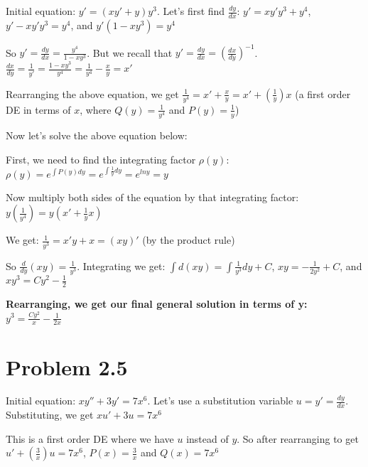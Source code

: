 \documentclass{article}
\begin{document}
\noindent Initial equation: $y' = (xy' + y)y^{3}$.  Let's first find $\frac{dy}{dx}$: $y' = xy'y^{3} + y^{4}$, $y' - xy'y^{3} = y^{4}$, and $y'(1 - xy^{3}) = y^{4}$\par
\noindent So $y' = \frac{dy}{dx} = \frac{y^{4}}{1 - xy^{3}}$.  But we recall that $y' = \frac{dy}{dx} = (\frac{dx}{dy})^{-1}$.  $\frac{dx}{dy} = \frac{1}{y'} = \frac{1 - xy^{3}}{y^{4}} = \frac{1}{y^{4}} - \frac{x}{y} = x'$ \par

\noindent Rearranging the above equation, we get $\frac{1}{y^{4}} = x' + \frac{x}{y} = x' + (\frac{1}{y})x$ (a first order DE in terms of $x$, where $Q(y) = \frac{1}{y^{4}}$ and $P(y) = \frac{1}{y}$) \par\vspace{0.25cm}

\noindent Now let's solve the above equation below: \par\vspace{0.25cm}

\noindent First, we need to find the integrating factor $\rho(y)$: $\rho(y) = e^{\int P(y)dy} = e^{\int \frac{1}{y}dy} = e^{lny} = y$ \par\vspace{0.25cm}

\noindent Now multiply both sides of the equation by that integrating factor: $y(\frac{1}{y^{4}}) = y(x' + \frac{1}{y}x)$ \par
\noindent We get: $\frac{1}{y^{3}} = x'y + x = (xy)'$ (by the product rule) \par
\noindent So $\frac{d}{dy}(xy) = \frac{1}{y^{3}}$.  Integrating we get: $\int d(xy) = \int \frac{1}{y^{3}} dy + C$, $xy = -\frac{1}{2y^{2}} + C$, and $xy^{3} = Cy^{2} - \frac{1}{2}$ \par\vspace{0.25cm}

\noindent \textbf{Rearranging, we get our final general solution in terms of y: $y^{3} = \frac{Cy^{2}}{x} - \frac{1}{2x}$}

\section{Problem 2.5}

\noindent Initial equation: $xy'' + 3y' = 7x^{6}$.  Let's use a substitution variable $u = y' = \frac{dy}{dx}$.  Substituting, we get $xu' + 3u = 7x^{6}$ \par

\noindent This is a first order DE where we have $u$ instead of $y$.  So after rearranging to get $u' + (\frac{3}{x})u = 7x^{6}$, $P(x) = \frac{3}{x}$ and $Q(x) = 7x^{6}$ \par\vspace{0.25cm}
\end{document}
